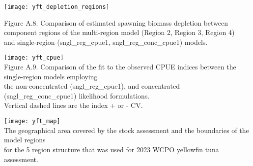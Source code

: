 \documentclass{SCreport}
\begin{document}
\vspace{1ex}

\texttt{[image: yft\_depletion\_regions]}

Figure A.8. Comparison of estimated spawning biomass depletion between\\[-0.8ex]
component regions of the multi-region model (Region 2, Region 3, Region
4)\\[-0.8ex]
and single-region (sngl\_reg\_cpue1, sngl\_reg\_conc\_cpue1) models.

\vspace{1ex}

\texttt{[image: yft\_cpue]}\\[1ex]

Figure A.9. Comparison of the fit to the observed CPUE indices between the
single-region models employing\\[-0.8ex]
the non-concentrated (sngl\_reg\_cpue1), and
concentrated (sngl\_reg\_conc\_cpue1) likelihood formulations.\\[-0.8ex]
Vertical dashed lines are the index + or - CV.

\vspace{1ex}

\texttt{[image: yft\_map]}\\[1ex]

The geographical area covered by the stock assessment and the
boundaries of the model regions\\[-0.8ex]
for the 5 region structure that was used for 2023 WCPO yellowfin tuna
assessment.
\end{document}
